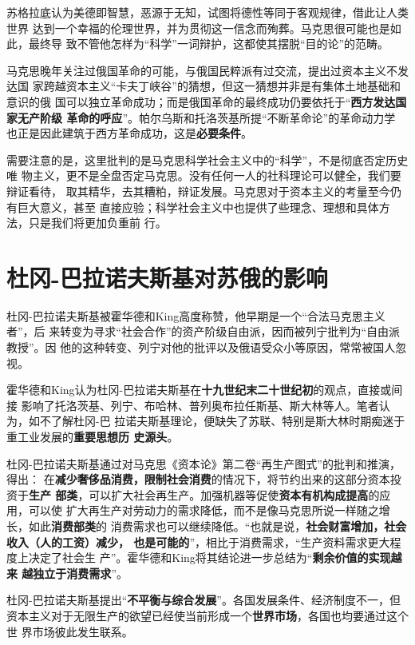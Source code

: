 苏格拉底认为美德即智慧，恶源于无知，试图将德性等同于客观规律，借此让人类世界
达到一个幸福的伦理世界，并为贯彻这一信念而殉葬。马克思很可能也是如此，最终导
致不管他怎样为“科学”一词辩护，这都使其摆脱“目的论”的范畴。

马克思晚年关注过俄国革命的可能，与俄国民粹派有过交流，提出过资本主义不发达国
家跨越资本主义“卡夫丁峡谷”的猜想，但这一猜想并非是有集体土地基础和意识的俄
国可以独立革命成功；而是俄国革命的最终成功仍要依托于“\textbf{西方发达国家无产阶级
  革命的呼应}”。\cite{mamincui}帕尔乌斯和托洛茨基所提“不断革命论”的革命动力学
也正是因此建筑于西方革命成功，这是\textbf{必要条件}。

需要注意的是，这里批判的是马克思科学社会主义中的“科学”，不是彻底否定历史唯
物主义，更不是全盘否定马克思。没有任何一人的社科理论可以健全，我们要辩证看待，
取其精华，去其糟粕，辩证发展。马克思对于资本主义的考量至今仍有巨大意义，甚至
直接应验；科学社会主义中也提供了些理念、理想和具体方法，只是我们将更加负重前
行。

\section{杜冈-巴拉诺夫斯基对苏俄的影响}

杜冈-巴拉诺夫斯基被霍华德和King高度称赞，他早期是一个“合法马克思主义者”，后
来转变为寻求“社会合作”的资产阶级自由派，因而被列宁批判为“自由派教授”。因
他的这种转变、列宁对他的批评以及俄语受众小等原因，常常被国人忽视。

霍华德和King认为杜冈-巴拉诺夫斯基在\textbf{十九世纪末二十世纪初}的观点，直接或间接
影响了托洛茨基、列宁、布哈林、普列奥布拉任斯基、斯大林等人。笔者认为，如不了解杜冈-巴
拉诺夫斯基理论，便缺失了苏联、特别是斯大林时期痴迷于重工业发展的\textbf{重要思想历
  史源头}。

杜冈-巴拉诺夫斯基通过对马克思《资本论》第二卷“再生产图式”的批判和推演，得出：
在\textbf{减少奢侈品消费，限制社会消费}的情况下，将节约出来的这部分资本投资于\textbf{生产
  部类}，可以扩大社会再生产。加强机器等促使\textbf{资本有机构成提高}的应用，可以使
扩大再生产对劳动力的需求降低，而不是像马克思所说一样随之增长，如此\textbf{消费部类}的
消费需求也可以继续降低。“也就是说，\textbf{社会财富增加，社会收入（人的工资）减少，
  也是可能的}”，相比于消费需求，“生产资料需求更大程度上决定了社会生
产”。\cite{lijingdugang}霍华德和King将其结论进一步总结为“\textbf{剩余价值的实现越来
  越独立于消费需求}”。

杜冈-巴拉诺夫斯基提出“\textbf{不平衡与综合发展}”。各国发展条件、经济制度不一，但
资本主义对于无限生产的欲望已经使当前形成一个\textbf{世界市场}，各国也均要通过这个世
界市场彼此发生联系。

